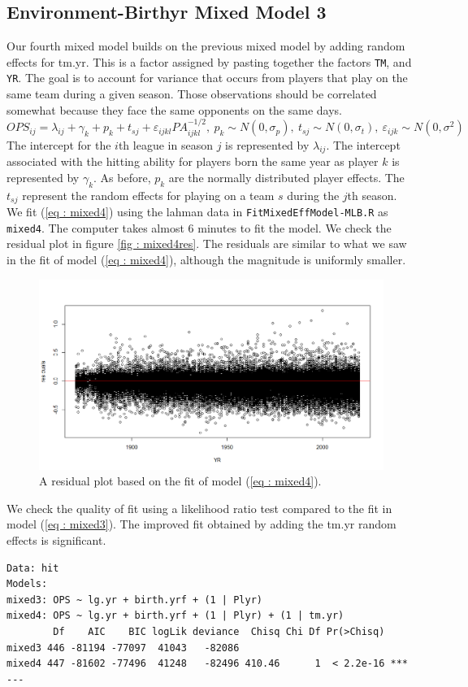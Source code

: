 \documentclass [52pt] {article}
\begin{document}
\subsection{Environment-Birthyr Mixed Model 3}
Our fourth mixed model builds on the previous mixed model by adding random effects for tm.yr.  This is a factor assigned by pasting together the factors \verb|TM|, and \verb|YR|.  The goal is to account for variance that occurs from players that play on the same team during a given season.  Those observations should be correlated somewhat because they face the same opponents on the same days.
\begin{equation}\label{eq : mixed4}
OPS_{ij} = \lambda_{ij} + \gamma_k +  p_k + t_{sj}+ \varepsilon_{ijkl} PA_{ijkl}^{-1/2},\:p_k\sim N(0,\sigma_p),\:t_{sj}\sim N(0,\sigma_t),\: \varepsilon_{ijk}\sim N(0,\sigma^2)
\end{equation}
The intercept for the $i$th league in season $j$ is represented by $\lambda_{ij}$.  The intercept associated with the hitting ability for players born the same year as player $k$ is represented by $\gamma_k$.  As before, $p_k$ are the normally distributed player effects.  The $t_{sj}$ represent the random effects for playing on a team $s$ during the $j$th season.  We fit (\ref{eq : mixed4}) using the lahman data in \verb|FitMixedEffModel-MLB.R| as \verb|mixed4|.  The computer takes almost 6 minutes to fit the model.  We check the residual plot in figure \ref{fig : mixed4res}.  The residuals are similar to what we saw in the fit of model (\ref{eq : mixed4}), although the magnitude is uniformly smaller.

\begin{figure}[h!]
\centering
\includegraphics[scale = 0.5]{mixed4res.png}
\caption{\label{fig : mixed3res} A residual plot based on the fit of model (\ref{eq : mixed4}).}
\end{figure}
We check the quality of fit using a likelihood ratio test compared to the fit in model (\ref{eq : mixed3}).  The improved fit obtained by adding the tm.yr random effects is significant.
\begin{verbatim}
Data: hit
Models:
mixed3: OPS ~ lg.yr + birth.yrf + (1 | Plyr)
mixed4: OPS ~ lg.yr + birth.yrf + (1 | Plyr) + (1 | tm.yr)
        Df    AIC    BIC logLik deviance  Chisq Chi Df Pr(>Chisq)    
mixed3 446 -81194 -77097  41043   -82086                             
mixed4 447 -81602 -77496  41248   -82496 410.46      1  < 2.2e-16 ***
---
\end{verbatim}
\end{document}
